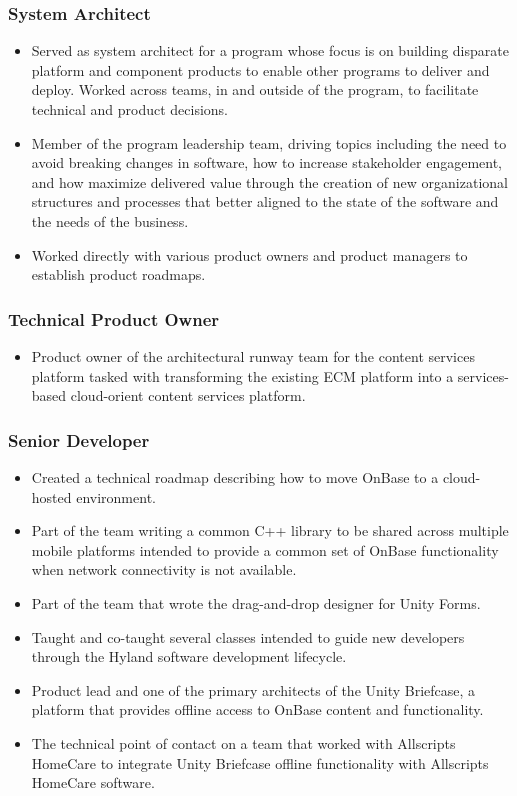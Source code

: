 \documentclass{cv_style}
\begin{document}
			\subsubsection*{System Architect}
			\textit{}
			\begin{itemize}
				\item Served as system architect for a program whose focus is on building disparate platform and component products to enable other programs to deliver and deploy. Worked across teams, in and outside of the program, to facilitate technical and product decisions.
				\item Member of the program leadership team, driving topics including the need to avoid breaking changes in software, how to increase stakeholder engagement, and how maximize delivered value through the creation of new organizational structures and processes that better aligned to the state of the software and the needs of the business.
				\item Worked directly with various product owners and product managers to establish product roadmaps.
			\end{itemize}

			\subsubsection*{Technical Product Owner}
			\textit{}
			\begin{itemize}
				\item Product owner of the architectural runway team for the content services platform tasked with transforming the existing ECM platform into a services-based cloud-orient content services platform. 
			\end{itemize}

			\subsubsection*{Senior Developer}
			\textit{}
			\begin{itemize}
				\item Created a technical roadmap describing how to move OnBase to a cloud-hosted environment.
				\item Part of the team writing a common C++ library to be shared across multiple mobile platforms intended to provide a common set of OnBase functionality when network connectivity is not available.
				\item Part of the team that wrote the drag-and-drop designer for Unity Forms.
				\item Taught and co-taught several classes intended to guide new developers through the Hyland software development lifecycle.
				\item Product lead and one of the primary architects of the Unity Briefcase, a platform that provides offline access to OnBase content and functionality.
				\item The technical point of contact on a team that worked with Allscripts HomeCare to integrate Unity Briefcase offline functionality with Allscripts HomeCare software.
			\end{itemize}
\end{document}
